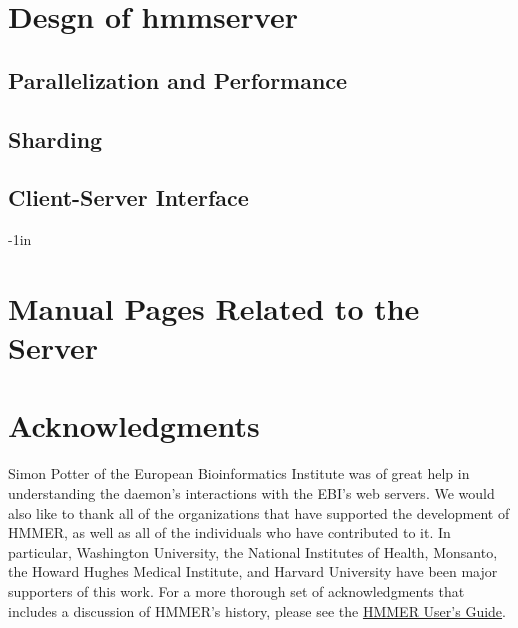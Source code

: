 \documentclass[notoc,justified,openany]{tufte-book}    %
\begin{document}
\chapter{Desgn of hmmserver}
\section{Parallelization and Performance}
\section{Sharding}
\section{Client-Server Interface}

\begin{adjustwidth}{}{-1in}   
\chapter{Manual Pages Related to the Server}

\end{adjustwidth}

\chapter{Acknowledgments}
Simon Potter of the European Bioinformatics Institute was of great help in understanding the daemon's interactions with the EBI's web servers.  We would also like to thank all of the organizations that have supported the development of HMMER, as well as all of the individuals who have contributed to it. In particular, Washington University, the National Institutes of Health, Monsanto, the Howard Hughes Medical Institute, and Harvard University have been major supporters of this work.  For a more thorough set of acknowledgments that includes a discussion of HMMER's history, please see the \underline{HMMER User's Guide}.

\label{manualend}

% 
\end{document}
